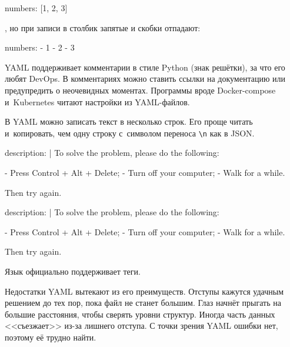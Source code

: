 \begin{english}
  \begin{yaml}
numbers: [1, 2, 3]
  \end{yaml}
\end{english}

\noindent
, но при записи в столбик запятые и скобки отпадают:

\pagebreakafive

\begin{english}
  \begin{yaml}
numbers:
  - 1
  - 2
  - 3
  \end{yaml}
\end{english}

YAML поддерживает комментарии в стиле Python (знак решётки), за что его любят
DevOps. В комментариях можно ставить ссылки на документацию или предупредить о
неочевидных моментах. Программы вроде Docker-compose и~Kubernetes читают
настройки из YAML-файлов.

В YAML можно записать текст в несколько строк. Его проще читать и~копировать,
чем одну строку с~символом переноса \verb|\n| как в JSON.

\ifnarrow

\begin{english}
  \begin{yaml}
description: |
  To solve the problem,
  please do the following:

  - Press Control + Alt + Delete;
  - Turn off your computer;
  - Walk for a while.

  Then try again.
  \end{yaml}
\end{english}

\else

\begin{english}
  \begin{yaml}
description: |
  To solve the problem, please do the following:

  - Press Control + Alt + Delete;
  - Turn off your computer;
  - Walk for a while.

  Then try again.
  \end{yaml}
\end{english}

\fi

Язык официально поддерживает теги.


Недостатки YAML вытекают из его преимуществ. Отступы кажутся удачным решением до
тех пор, пока файл не станет большим. Глаз начнёт прыгать на большие расстояния,
чтобы сверять уровни структур. Иногда часть данных <<съезжает>> из-за лишнего
отступа. С точки зрения YAML ошибки нет, поэтому её трудно найти.

